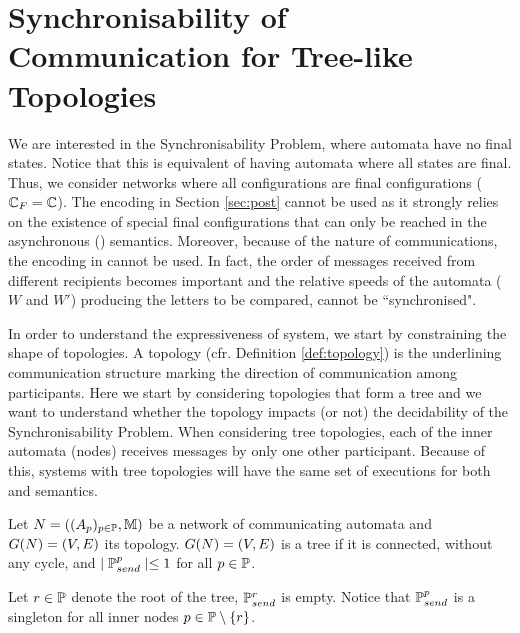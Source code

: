 \documentclass[submission,copyright,creativecommons,UKenglish]{eptcs}
\begin{document}
\section{Synchronisability of \MAILBOX Communication for Tree-like Topologies}
\label{sec:decidability}
We are interested in the Synchronisability Problem, where automata have no final states. Notice that this is equivalent of having automata where all states are final. Thus, we  consider networks where all configurations are final configurations \mbox{($\mathbb{C}_F = \mathbb{C}$).} 
The encoding in Section \ref{sec:post} cannot be used as it strongly relies on the existence of special final configurations that can only be reached in the asynchronous (\Mailbox) semantics. Moreover, because of the nature of \Mailbox communications, the encoding in \cite{finkel_synchronizability_2017} cannot be used. In fact, the order of messages received from different recipients becomes important and the relative speeds of the automata ($W$ and $W'$) producing the letters to be compared, cannot be ``synchronised".

In order to understand the expressiveness of \Mailbox system, we start by constraining the shape of topologies. A topology (cfr. Definition \ref{def:topology}) is the underlining communication structure marking the direction of communication among participants.
Here  we start by considering topologies that form a tree and we want to understand whether the topology impacts (or not) the decidability of the Synchronisability Problem. 
When considering tree topologies, each of the inner automata (nodes) receives messages by only one other participant. Because of this, systems with  tree topologies will have the same set of executions for both  \Mailbox and \Ptp semantics. 


\begin{definition}
	Let $N=((A_{p})_{p\in \mathbb{P}}, \mathbb{M})$ be a network of communicating automata and $G(N) = (V,E)$ its topology. 
	$G(N) = (V,E)$ is a tree if it is connected, without any cycle, and $ \mid \mathbb{P}_{send}^{p}\mid \leq 1 $ for all $ p \in \mathbb{P} $.
\end{definition}

Let $ r \in \mathbb{P} $ denote the root of the tree, \ie $ \mathbb{P}_{send}^{r} $ is empty. Notice that
$ \mathbb{P}_{send}^{p} $ is a singleton for all inner nodes $ p\in \mathbb{P}\setminus{\left\lbrace r\right\rbrace} $.
\end{document}
